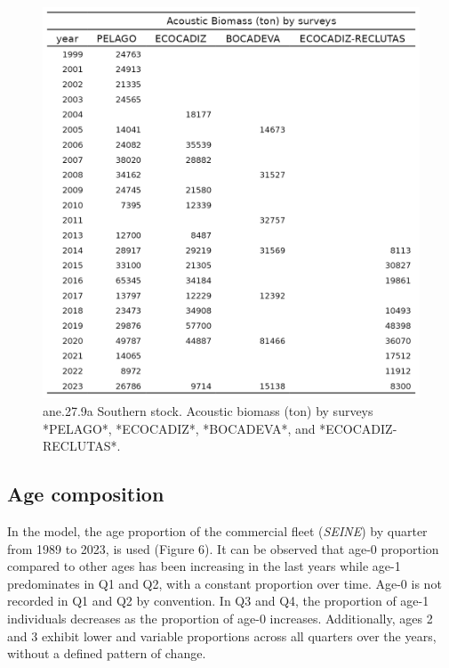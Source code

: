 \documentclass[
]{article}
\begin{document}
\begin{figure}[H]

{\centering \includegraphics[width=0.95\linewidth]{report/run/S1.0_4FLEETS_SelECO_RecIndex_Mnewfix/tb_index} 

}

\caption{ane.27.9a Southern stock. Acoustic biomass (ton) by surveys *PELAGO*, *ECOCADIZ*, *BOCADEVA*, and *ECOCADIZ-RECLUTAS*.   }\label{fig:unnamed-chunk-32}
\end{figure}

\hypertarget{age-composition}{%
\subsection{Age composition}\label{age-composition}}

In the model, the age proportion of the commercial fleet (\emph{SEINE})
by quarter from 1989 to 2023, is used (Figure 6). It can be observed
that age-0 proportion compared to other ages has been increasing in the
last years while age-1 predominates in Q1 and Q2, with a constant
proportion over time. Age-0 is not recorded in Q1 and Q2 by convention.
In Q3 and Q4, the proportion of age-1 individuals decreases as the
proportion of age-0 increases. Additionally, ages 2 and 3 exhibit lower
and variable proportions across all quarters over the years, without a
defined pattern of change.
\end{document}
